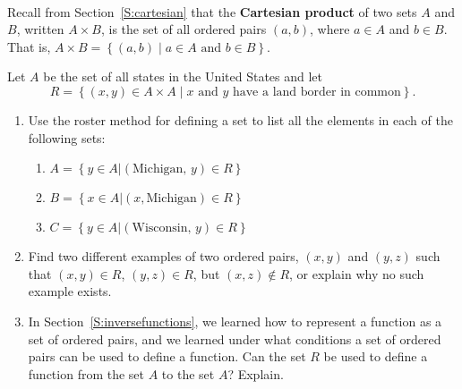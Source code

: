 \begin{previewactivity} \label{PA:USA} \hfill \\
Recall from Section~\ref{S:cartesian} that the \textbf{Cartesian product}
%
 of two sets  $A$  and  $B$, written  $A \times B$, is the set of all ordered pairs  
$\left( {a,b} \right)$,  where  $a \in A$  and  $b \in B$.  That is,
$A \times B = \left\{ {\left( {a,b} \right)  \mid a \in A\text{ and }b \in B} \right\}$.

\vskip6pt
Let  $A$  be the set of all states in the United States and let
\[
R = \left\{ { {\left( {x, y} \right) \in A \times A } \mid x \text{  and  }y 
\text{  have a land border in common}} \right\}\!.
\]
\begin{enumerate}
\item Use the roster method for defining a set to list all the elements in each of the following sets:
\begin{enumerate}
\item $A = \left\{ {y \in A\left| {\left( {\text{Michigan, }y} \right) \in R} \right.} \right\}$

\item $B = \left\{ {x \in A\left| {\left( {x,\text{Michigan}} \right) \in R} \right.} \right\}$

\item $C = \left\{ {y \in A\left| {\left( {\text{Wisconsin, }y} \right) \in R} \right.} \right\}$

\end{enumerate}

\item Find two different examples of two ordered pairs,  $\left( {x, y} \right)$ and 
$\left( {y, z} \right)$ such that  $\left( {x, y} \right) \in R$,  
$\left( {y, z} \right) \in R$,  but  $\left( {x, z} \right)\not  \in R$, or explain why no such example exists.


\item In Section~\ref{S:inversefunctions}, we learned how to represent a function as a set of ordered pairs, and we learned under what conditions a set of ordered pairs can be used to define a function. Can the set  $R$  be used to define a function from the set  $A$  to the set  $A$?  Explain.
\end{enumerate}
\end{previewactivity}
\hbreak


